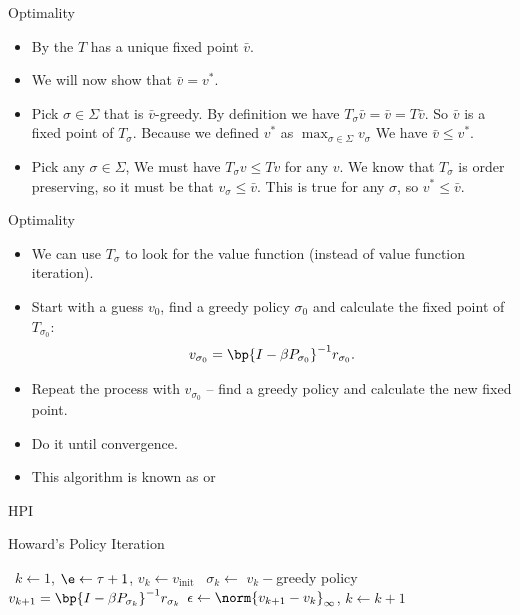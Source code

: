 \documentclass[11pt,xcolor={dvipsnames},aspectratio=159,hyperref={pdftex,pdfpagemode=UseNone,hidelinks,pdfdisplaydoctitle=true},usepdftitle=false]{beamer}
\begin{document}
\begin{frame}{Optimality}   
    \begin{itemize}
        \item By the  $T$ has a unique fixed point $\bar{v}$.
       \item We will now show that $\bar{v} = v^*$.
       \item Pick $\sigma\in\Sigma$ that is $\bar{v}$-greedy. By definition we have $T_\sigma \bar{v} = \bar{v} = T \bar{v}$. So $\bar{v}$ is a fixed point of $T_\sigma$. Because we defined $v^*$ as $\max_{\sigma\in\Sigma} v_\sigma$ We have $\bar{v} \leq v^*$.
       \item Pick any $\sigma\in\Sigma$, We must have $T_\sigma v \leq Tv$ for any $v$. We know that $T_\sigma$ is order preserving, so it must be that $v_\sigma \leq \bar{v}$. This is true for any $\sigma$, so $v^* \leq \bar{v}$.
        \end{itemize}
    \end{frame}  

\begin{frame}{Optimality}   
    \begin{itemize}
        \item We can use $T_\sigma$ to look for the value function (instead of value function iteration).
        \item Start with a guess $v_0$, find a greedy policy $\sigma_0$ and calculate the fixed point of $T_{\sigma_0}$:
         \begin{align*}
            v_{\sigma_0}=\bp{I - \beta P_{\sigma_0}}^{-1} r_{\sigma_0}.
        \end{align*}
        \item Repeat the process with $v_{\sigma_0}$ -- find a greedy policy and calculate the new fixed point.
        \item Do it until convergence.
        \item This algorithm is known as  or 
    \end{itemize}
    \end{frame}  

\begin{frame}{HPI}
    \begin{algorithm}[H]
        \caption{Howard's Policy Iteration}
        \begin{algorithmic}[1]
         \
        \State $k \gets 1$, $\e \gets \tau + 1$, $v_k \gets v_{\text{init}}$
        \While{$\e>\tau$} \
        \State $\sigma_k \gets$ $v_k-$greedy policy
        \State $v_{k+1}=\bp{I - \beta P_{\sigma_k}}^{-1} r_{\sigma_k}$
        \State $\epsilon \gets \norm{v_{k+1}-v_k}_\infty$, $k \gets k+1$
        \EndWhile
        \EndProcedure
        \end{algorithmic}
        \end{algorithm}
\end{frame}
\end{document}
